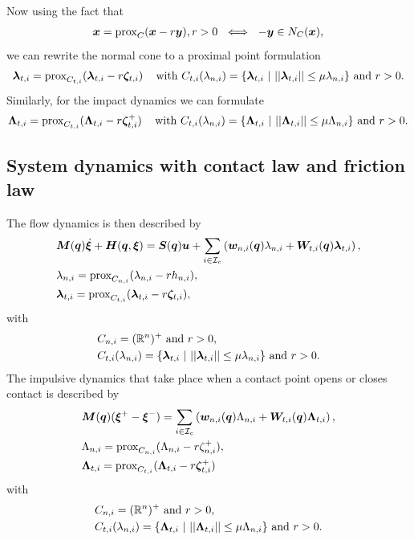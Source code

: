 \documentclass[DC2017114Bouma.tex]{subfiles}
\begin{document}
Now using the fact that
\begin{align}
{\boldsymbol{x}} = \operatorname{\text{prox}}_C({\boldsymbol{x}} -r{\boldsymbol{y}}), r > 0\ \iff\ -{\boldsymbol{y}}\in N_C({\boldsymbol{x}}),
\end{align}
we can rewrite the normal cone to a proximal point formulation
\begin{align}
\boldsymbol{\lambda}_{t,i} = \operatorname{\text{prox}}_{C_{t,i}}(\boldsymbol{\lambda}_{t,i} - r\boldsymbol{\zeta}_{t,i})\,\quad\text{with }C_{t,i}(\lambda_{n,i}) = \{\boldsymbol{\lambda}_{t,i}\ |\ ||\boldsymbol{\lambda}_{t,i}|| \leq \mu\lambda_{n,i}\}\text{ and }r>0.
\end{align}
Similarly, for the impact dynamics we can formulate
\begin{align}
\boldsymbol{\Lambda}_{t,i} = \operatorname{\text{prox}}_{C_{t,i}}(\boldsymbol{\Lambda}_{t,i} - r\boldsymbol{\zeta}^+_{t,i})\,\quad \text{with }C_{t,i}(\lambda_{n,i}) = \{\boldsymbol{\Lambda}_{t,i}\ |\ ||\boldsymbol{\Lambda}_{t,i}|| \leq \mu\Lambda_{n,i}\}\text{ and }r>0.
\end{align}

\subsection{System dynamics with contact law and friction law}
The flow dynamics is then described by
\begin{align}
&{\boldsymbol{M}}({\boldsymbol{q}})\dot{\boldsymbol{\xi}} + {\boldsymbol{H}}({\boldsymbol{q}},\boldsymbol{\xi}) = {\boldsymbol{S}}({\boldsymbol{q}}){\boldsymbol{u}} + \sum_{i\in\mathcal{I}_c}\left({\boldsymbol{w}}_{n,i}({\boldsymbol{q}})\lambda_{n,i} + {\boldsymbol{W}}_{t,i}({\boldsymbol{q}})\boldsymbol{\lambda}_{t,i} \right), \label{eq:proxcontact1}\\
&\lambda_{n,i} = \operatorname{\text{prox}}_{C_{n,i}}(\lambda_{n,i} - rh_{n,i}),\label{eq:proxcontact2}\\
&\boldsymbol{\lambda}_{t,i} = \operatorname{\text{prox}}_{C_{t,i}}(\boldsymbol{\lambda}_{t,i} - r\boldsymbol{\zeta}_{t,i}),\label{eq:proxcontact3}
\end{align}
with
\begin{align}
&C_{n,i} = (\mathbb{R}^n)^+\text{ and } r>0,\\
&C_{t,i}(\lambda_{n,i}) = \{\boldsymbol{\lambda}_{t,i}\ |\ ||\boldsymbol{\lambda}_{t,i}|| \leq \mu\lambda_{n,i}\}\text{ and }r>0.
\end{align}
The impulsive dynamics that take place when a contact point opens or closes contact is described by
\begin{align}
&{\boldsymbol{M}}({\boldsymbol{q}})(\boldsymbol{\xi}^+ - \boldsymbol{\xi}^-) = \sum_{i\in\mathcal{I}_c}\left( {\boldsymbol{w}}_{n,i}({\boldsymbol{q}})\Lambda_{n,i} + {\boldsymbol{W}}_{t,i}({\boldsymbol{q}})\boldsymbol{\Lambda}_{t,i}\right), \label{eq:proximpact1}\\
&\Lambda_{n,i} = \operatorname{\text{prox}}_{C_{n,i}}(\Lambda_{n,i} - r\zeta^+_{n,i}),\label{eq:proximpact2}\\
&\boldsymbol{\Lambda}_{t,i} = \operatorname{\text{prox}}_{C_{t,i}}(\boldsymbol{\Lambda}_{t,i} - r\boldsymbol{\zeta}^+_{t,i})\,\label{eq:proximpact3}
\end{align}
with
\begin{align}
&C_{n,i} = (\mathbb{R}^n)^+\text{ and } r>0,\\
&C_{t,i}(\lambda_{n,i}) = \{\boldsymbol{\Lambda}_{t,i}\ |\ ||\boldsymbol{\Lambda}_{t,i}|| \leq \mu\Lambda_{n,i}\}\text{ and }r>0.
\end{align}
\end{document}
